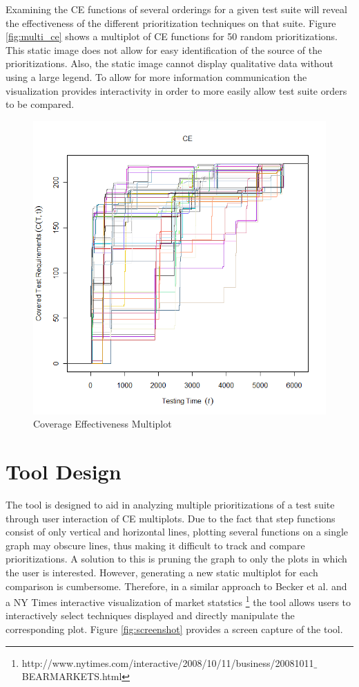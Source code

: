 \documentclass{vgtc}                          %
\begin{document}
Examining the CE functions of several orderings for a given test suite will reveal the effectiveness of the different prioritization techniques on that suite.  Figure \ref{fig:multi_ce} shows a multiplot of CE functions for 50 random prioritizations.  This static image does not allow for easy identification of the source of the prioritizations.  Also, the static image cannot display qualitative data without using a large legend.  To allow for more information communication the visualization provides interactivity in order to more easily allow test suite orders to be compared.

\begin{figure}[t]
\centering
\includegraphics[scale=.25]{original.png}
\caption{Coverage Effectiveness Multiplot}
\end{figure}
\label{fig:multi_ce}

\section{Tool Design}

The tool is designed to aid in analyzing multiple prioritizations of a test suite through user interaction of CE multiplots. Due to the fact that step functions consist of only vertical and horizontal lines, plotting several functions on a single graph may obscure lines, thus making it difficult to track and compare prioritizations.  A solution to this is pruning the graph to only the plots in which the user is interested.  However, generating a new static multiplot for each comparison is cumbersome.  Therefore, in a similar approach to Becker et al$.$ \cite{Stephen95visualizingnetwork} and a NY Times interactive visualization of market statstics \footnote[1]{http://www.nytimes.com/interactive/2008/10/11/business/20081011$\_$BEARMARKETS.html} the tool allows users to interactively select techniques displayed and directly manipulate the corresponding plot.  Figure \ref{fig:screenshot} provides a screen capture of the tool.  
\end{document}
